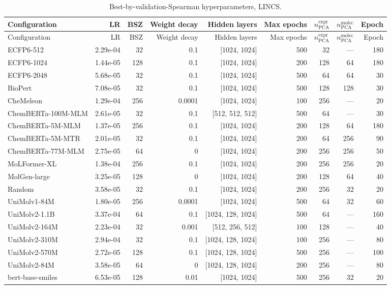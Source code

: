 \begin{longtable}{lrrrrrrrr}
\caption{Best-by-validation-Spearman hyperparameters, LINCS.} \label{tab:hp_lincs} \\
\toprule
Configuration & LR & BSZ & Weight decay & Hidden layers & Max epochs & $n_\mathrm{PCA}^{\mathrm{expr}}$ & $n_\mathrm{PCA}^{\mathrm{molec}}$ & Epoch \\
\midrule
\endfirsthead
\toprule
Configuration & LR & BSZ & Weight decay & Hidden layers & Max epochs & $n_\mathrm{PCA}^{\mathrm{expr}}$ & $n_\mathrm{PCA}^{\mathrm{molec}}$ & Epoch \\
\midrule
\endhead
\bottomrule
\endfoot
ECFP6-512 & 2.29e-04 & 32 & 0.1 & [1024, 1024] & 500 & 32 & — & 180 \\
ECFP6-1024 & 1.44e-05 & 128 & 0.1 & [1024, 1024] & 200 & 128 & 64 & 180 \\
ECFP6-2048 & 5.68e-05 & 32 & 0.1 & [1024, 1024] & 500 & 64 & 64 & 30 \\
BioPert & 7.08e-05 & 32 & 0.1 & [1024, 1024] & 500 & 128 & 128 & 30 \\
CheMeleon & 1.29e-04 & 256 & 0.0001 & [1024, 1024] & 100 & 256 & — & 20 \\
ChemBERTa-100M-MLM & 2.61e-05 & 32 & 0.1 & [512, 512, 512] & 500 & 64 & — & 30 \\
ChemBERTa-5M-MLM & 1.37e-05 & 256 & 0.1 & [1024, 1024] & 200 & 128 & 64 & 180 \\
ChemBERTa-5M-MTR & 2.01e-05 & 32 & 0.1 & [1024, 1024] & 200 & 64 & 256 & 90 \\
ChemBERTa-77M-MLM & 2.75e-05 & 64 & 0 & [1024, 1024] & 200 & 256 & 256 & 50 \\
MoLFormer-XL & 1.38e-04 & 256 & 0.1 & [1024, 1024] & 200 & 256 & 256 & 20 \\
MolGen-large & 3.25e-05 & 128 & 0 & [1024, 1024] & 200 & 128 & 64 & 40 \\
Random & 3.58e-05 & 32 & 0.1 & [1024, 1024] & 200 & 256 & 32 & 20 \\
UniMolv1-84M & 1.80e-05 & 256 & 0.0001 & [1024, 1024] & 500 & 64 & 32 & 60 \\
UniMolv2-1.1B & 3.37e-04 & 64 & 0.1 & [1024, 128, 1024] & 500 & 64 & — & 160 \\
UniMolv2-164M & 2.23e-04 & 32 & 0.001 & [512, 256, 512] & 100 & 128 & — & 40 \\
UniMolv2-310M & 2.94e-04 & 32 & 0.1 & [1024, 128, 1024] & 100 & 256 & — & 80 \\
UniMolv2-570M & 2.72e-05 & 128 & 0.1 & [1024, 128, 1024] & 500 & 256 & — & 100 \\
UniMolv2-84M & 3.58e-05 & 64 & 0 & [1024, 128, 1024] & 200 & 256 & — & 80 \\
bert-base-smiles & 6.53e-05 & 128 & 0.01 & [1024, 1024] & 500 & 256 & 32 & 20 \\
\end{longtable}
